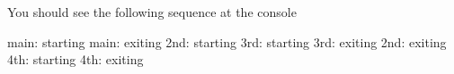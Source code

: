 You should see the following sequence at the console

main\+: starting main\+: exiting 2nd\+: starting 3rd\+: starting 3rd\+: exiting 2nd\+: exiting 4th\+: starting 4th\+: exiting 